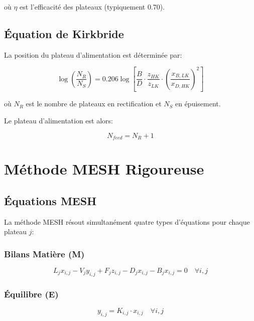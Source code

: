 \documentclass[11pt,a4paper]{article}
\begin{document}
où $\eta$ est l'efficacité des plateaux (typiquement 0.70).

\subsection{Équation de Kirkbride}

La position du plateau d'alimentation est déterminée par:

\begin{equation}
\log\left(\frac{N_R}{N_S}\right) = 0.206 \log\left[\frac{B}{D} \cdot \frac{z_{HK}}{z_{LK}} \cdot \left(\frac{x_{B,LK}}{x_{D,HK}}\right)^2\right]
\end{equation}

où $N_R$ est le nombre de plateaux en rectification et $N_S$ en épuisement.

Le plateau d'alimentation est alors:

\begin{equation}
N_{feed} = N_R + 1
\end{equation}

\section{Méthode MESH Rigoureuse}

\subsection{Équations MESH}

La méthode MESH résout simultanément quatre types d'équations pour chaque plateau $j$:

\subsubsection{Bilans Matière (M)}

\begin{equation}
L_j x_{i,j} - V_j y_{i,j} + F_j z_{i,j} - D_j x_{i,j} - B_j x_{i,j} = 0 \quad \forall i,j
\end{equation}

\subsubsection{Équilibre (E)}

\begin{equation}
y_{i,j} = K_{i,j} \cdot x_{i,j} \quad \forall i,j
\end{equation}
\end{document}
